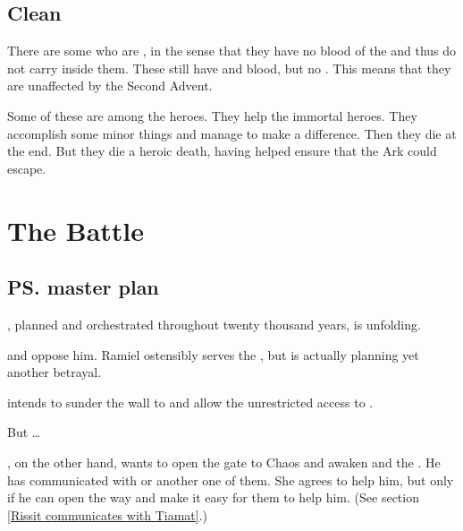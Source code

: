 \subsection{Clean \humans}
There are some \humans who are , in the sense that they have no blood of the  and thus do not carry \Lithrim inside them. 
These \humans still have \bane and \resphan blood, but no \Lithrim.
This means that they are unaffected by the Second Advent. 

Some of these \humans are among the heroes. 
They help the immortal heroes.
They accomplish some minor things and manage to make a difference. 
Then they die at the end.
But they die a heroic death, having helped ensure that the Ark could escape. 
















\section{The \Matrices Battle}









\subsection{\ps{\Daggerrain} master plan}
, planned and orchestrated throughout twenty thousand years, is unfolding. 

\Secherdamon{} and \Ishnaruchaefir{} oppose him. Ramiel ostensibly serves the \banes, but is actually planning yet another betrayal.

\Daggerrain{} intends to sunder the wall to \Erebos{} and allow the \Voidbringer{} unrestricted access to \Miith{}. 

But \ldots{}

\Secherdamon, on the other hand, wants to open the gate to Chaos and awaken \Tiamat{} and the \firstgendragons. He has communicated with \KhothSell{} or another one of them. She agrees to help him, but only if he can open the way and make it easy for them to help him. (See section \ref{Rissit communicates with Tiamat}.)

